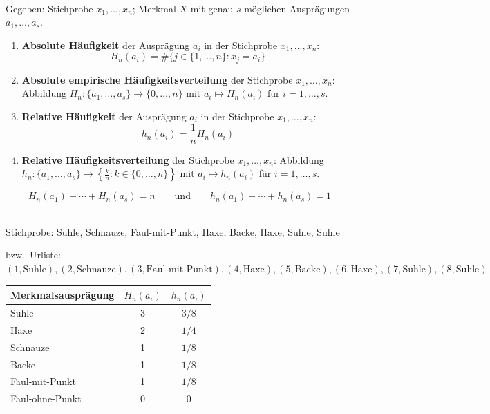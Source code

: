 \begin{defi}  \\
    Gegeben: Stichprobe $x_1,\dots,x_n$; \gls{Merkmal} $X$ mit genau $s$ möglichen Ausprägungen $a_1,\dots,a_s$.
    \begin{enumerate}[label=(\alph*)]
        \item \textbf{Absolute Häufigkeit} der Ausprägung $a_i$ in der Stichprobe $x_1,\dots,x_n$:
        \[
            H_n(a_i) = \#\{j\in\{1,\dots,n\} : x_j = a_i\}
        \]
        \item \textbf{Absolute empirische \gls{Häufigkeitsverteilung}} der Stichprobe $x_1,\dots,x_n$:
        Abbildung $H_n : \{a_1,\dots,a_s\}\to\{0,\dots,n\}$ mit $a_i\mapsto H_n(a_i)$ für $i=1,\dots,s$.
        \item \textbf{Relative Häufigkeit} der Ausprägung $a_i$ in der Stichprobe $x_1,\dots,x_n$:
        \[
            h_n(a_i) = \frac{1}{n} H_n(a_i)
        \]
        \item \textbf{Relative \gls{Häufigkeitsverteilung}} der Stichprobe $x_1,\dots,x_n$:
        Abbildung $h_n : \{a_1,\dots,a_s\}\to\left\{\frac{k}{n} : k\in\{0,\dots,n\}\right\}$ mit $a_i\mapsto h_n(a_i)$ für $i=1,\dots,s$.
    \end{enumerate}
\end{defi}

\begin{bem}
    \[
        H_n(a_1)+\cdots+H_n(a_s) = n \qquad\text{und}\qquad h_n(a_1)+\cdots+h_n(a_s)=1
    \]
\end{bem}

\begin{bsp}\label{bsp:acht-schweinchen}   \\
    Stichprobe: Suhle, Schnauze, Faul-mit-Punkt, Haxe, Backe, Haxe, Suhle, Suhle

    bzw.\ Urliste: $(1,\text{Suhle}),(2,\text{Schnauze}),(3,\text{Faul-mit-Punkt}),(4,\text{Haxe}),(5,\text{Backe}),(6,\text{Haxe}),(7,\text{Suhle}),(8,\text{Suhle})$

    \begin{mytable}
        \begin{tabular}{lcc}
            \hline
            \textbf{Merkmalsausprägung} & $H_n(a_i)$ & $h_n(a_i)$ \\
            \hline
            Suhle             & 3 & $3/8$ \\
            Haxe              & 2 & $1/4$ \\
            Schnauze          & 1 & $1/8$ \\
            Backe             & 1 & $1/8$ \\
            Faul-mit-Punkt    & 1 & $1/8$ \\
            Faul-ohne-Punkt   & 0 & $0$ \\
            \hline
        \end{tabular}
    \end{mytable}
\end{bsp}

